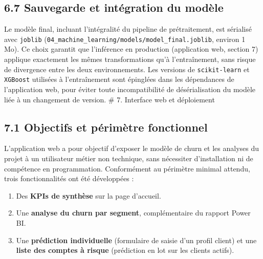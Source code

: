 \documentclass[11pt,a4paper]{article}
\providecommand{\tightlist}{\setlength{\itemsep}{0pt}\setlength{\parskip}{0pt}}
\begin{document}
\hypertarget{sauvegarde-et-intuxe9gration-du-moduxe8le}{%
\subsection{6.7 Sauvegarde et intégration du
modèle}\label{sauvegarde-et-intuxe9gration-du-moduxe8le}}

Le modèle final, incluant l'intégralité du pipeline de prétraitement,
est sérialisé avec \texttt{joblib}
(\texttt{04\_\hspace{0pt}machine\_\hspace{0pt}learning/\hspace{0pt}models/\hspace{0pt}model\_\hspace{0pt}final.joblib},
environ 1 Mo). Ce choix garantit que l'inférence en production
(application web, section 7) applique exactement les mêmes
transformations qu'à l'entraînement, sans risque de divergence entre les
deux environnements. Les versions de \texttt{scikit-learn} et
\texttt{XGBoost} utilisées à l'entraînement sont épinglées dans les
dépendances de l'application web, pour éviter toute incompatibilité de
désérialisation du modèle liée à un changement de version. \# 7.
Interface web et déploiement

\hypertarget{objectifs-et-puxe9rimuxe8tre-fonctionnel}{%
\subsection{7.1 Objectifs et périmètre
fonctionnel}\label{objectifs-et-puxe9rimuxe8tre-fonctionnel}}

L'application web a pour objectif d'exposer le modèle de churn et les
analyses du projet à un utilisateur métier non technique, sans
nécessiter d'installation ni de compétence en programmation.
Conformément au périmètre minimal attendu, trois fonctionnalités ont été
développées :

\begin{enumerate}
\def\labelenumi{\arabic{enumi}.}
\tightlist
\item
  Des \textbf{KPIs de synthèse} sur la page d'accueil.
\item
  Une \textbf{analyse du churn par segment}, complémentaire du rapport
  Power BI.
\item
  Une \textbf{prédiction individuelle} (formulaire de saisie d'un profil
  client) et une \textbf{liste des comptes à risque} (prédiction en lot
  sur les clients actifs).
\end{enumerate}
\end{document}
